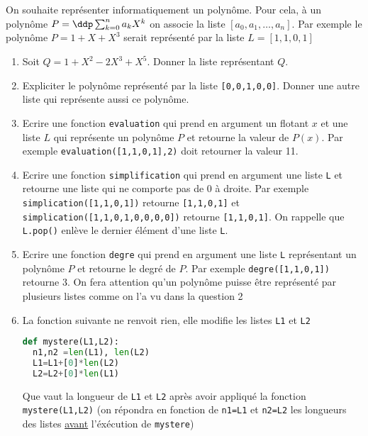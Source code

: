 \documentclass[a4paper, 11pt,reqno]{article}
\begin{document}
\begin{exercice}
On souhaite représenter informatiquement un polynôme. Pour cela, à un polynôme $P=\ddp \sum_{k=0}^n a_k X^k$ on associe la liste 
$[a_0, a_1, \dots, a_n]$. Par exemple le polynôme $P=1+X+X^3$ serait représenté par la liste $L=[1,1,0,1]$
\begin{enumerate}
\item Soit $Q=1+X^2- 2X^3 +X^5$. Donner la liste représentant $Q$. 
\item Expliciter le polynôme représenté par la liste \texttt{[0,0,1,0,0]}. Donner une autre liste qui représente aussi ce polynôme. 
\item Ecrire une fonction \texttt{evaluation} qui prend en argument un flotant $x$ et  une liste $L$  qui représente un polynôme $P$ et retourne la valeur de $P(x)$.
Par exemple \texttt{evaluation([1,1,0,1],2)} doit retourner la valeur 11.
\item 
Ecrire une fonction \texttt{simplification} qui prend en argument une liste \texttt{L} et retourne une liste qui ne comporte pas de $0$ à droite. 
Par exemple \texttt{simplication([1,1,0,1])} retourne \texttt{[1,1,0,1]} et 
 \texttt{simplication([1,1,0,1,0,0,0,0])} retourne \texttt{[1,1,0,1]}. On rappelle que \texttt{L.pop()} enlève le dernier élément d'une liste \texttt{L}.
 
\item Ecrire une fonction \texttt{degre} qui prend en argument une liste \texttt{L} représentant un polynôme $P$ et retourne le degré de $P$. Par exemple \texttt{degre([1,1,0,1])} retourne 3. On fera attention qu'un polynôme puisse être représenté par plusieurs listes comme on l'a vu dans la question 2

\item  La fonction suivante ne renvoit rien, elle modifie les listes \texttt{L1} et \texttt{L2}
\begin{lstlisting}[language =Python]
def mystere(L1,L2):
  n1,n2 =len(L1), len(L2)
  L1=L1+[0]*len(L2)
  L2=L2+[0]*len(L1)
\end{lstlisting}

Que vaut la longueur de \texttt{L1} et \texttt{L2} après avoir appliqué la fonction \texttt{mystere(L1,L2)} (on répondra en fonction de  \texttt{n1=L1} et \texttt{n2=L2} les longueurs des listes \underline{avant} l'éxécution de \texttt{mystere}) 



\end{enumerate}
\end{exercice}
\end{document}
